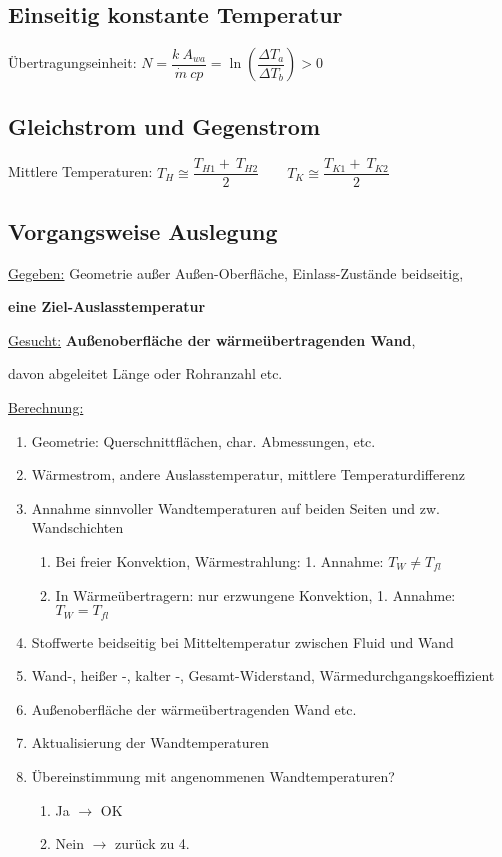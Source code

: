 \subsection{Einseitig konstante Temperatur} \label{sec:einseitig-konst-T}
	Übertragungseinheit: \qquad $ N  =  \dfrac{k\ A_{wa}}{\dot{m}\ cp}  =   \ln\left( \dfrac{\Delta T_a}{\Delta T_b} \right)  >  0 $

\subsection{Gleichstrom und Gegenstrom}
	Mittlere Temperaturen:	\qquad	$ T_H \cong \dfrac{T_{H1}+\ T_{H2}}{2}  \qquad T_K\cong \dfrac{T_{K1}+\ T_{K2}}{2} $

\subsection{Vorgangsweise Auslegung}
	\underline{Gegeben:} Geometrie außer Außen-Oberfläche, Einlass-Zustände beidseitig,

		\qquad \textbf{eine Ziel-Auslasstemperatur }

	\underline{Gesucht:} \textbf{Außenoberfläche der wärmeübertragenden Wand},

		\qquad davon abgeleitet Länge oder Rohranzahl etc.

	\begin{singlespace}
	\underline{Berechnung:}
		\begin{enumerate}
		\item Geometrie: Querschnittflächen, char. Abmessungen, etc.
		\item Wärmestrom, andere Auslasstemperatur, mittlere Temperaturdifferenz
		\item Annahme sinnvoller Wandtemperaturen auf beiden Seiten und zw. Wandschichten
		\begin{enumerate}
			\item Bei freier Konvektion, Wärmestrahlung:          \hfill 1. Annahme:	$ T_W \neq T_{fl}  $ \hspace{3cm} \null
			\item In Wärmeübertragern: nur erzwungene Konvektion, \hfill 1. Annahme:	$ T_W = T_{fl} $     \hspace{3cm} \null
		\end{enumerate}
		\item Stoffwerte beidseitig bei Mitteltemperatur zwischen Fluid und Wand
		\item Wand-, heißer -, kalter -, Gesamt-Widerstand, Wärmedurchgangskoeffizient
		\item Außenoberfläche der wärmeübertragenden Wand etc.
		\item Aktualisierung der Wandtemperaturen
		\item Übereinstimmung mit angenommenen Wandtemperaturen?
		\begin{enumerate}
			\item Ja $ \rightarrow $ OK
			\item Nein $ \rightarrow $ zurück zu 4.
		\end{enumerate}
		\end{enumerate}
	\end{singlespace}

